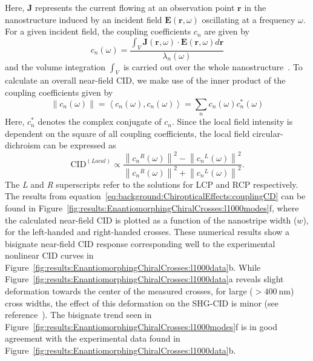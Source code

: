 Here, $\mathbf{J}$ represents the current flowing at an observation point $\mathbf{r}$ in the nanostructure induced by an incident field $\mathbf{E}(\mathbf{r}, \omega)$ oscillating at a frequency $\omega$. For a given incident field, the coupling coefficients $c_n$ are given by
\begin{equation}\label{eq:background:ChiropticalEffects:couplingCoefficients}	
	c_n(\omega) = \frac{\int_{V} \mathbf{J}(\mathbf{r}, \omega) \cdot \mathbf{E}(\mathbf{r}, \omega) d\mathbf{r}}{\lambda_{n}(\omega)}
\end{equation}
and the volume integration $\int_{V}$ is carried out over the whole nanostructure~\cite{Zheng2013}. 
To calculate an overall near-field CID, we make use of the inner product of the coupling coefficients given by
\begin{equation}\label{eq:background:ChiropticalEffects:couplingInnerProduct}	
	\left\| c_{n}(\omega ) \right\| = \left\langle c_{n}(\omega),c_{n}(\omega) \right\rangle = \sum\limits_n c_{n}(\omega) c_{n}^* (\omega)
\end{equation}
Here, $c_{n}^*$ denotes the complex conjugate of $c_{n}$.
Since the local field intensity is dependent on the square of all coupling coefficients, the local field circular-dichroism can be expressed as
\begin{equation}\label{eq:background:ChiropticalEffects:couplingCD}	
	\mathrm{CID}^{(Local)} \propto \frac{{\left\| {{c_n}^R(\omega )} \right\|}^2 - {\left\| {{c_n}^L(\omega )} \right\|}^2}{{\left\| {{c_n}^R(\omega )} \right\|}^2 + {\left\| {{c_n}^L(\omega )} \right\|}^2}.
\end{equation}
The \textit{L} and \textit{R} superscripts refer to the solutions for LCP and RCP respectively. 
The results from equation~\ref{eq:background:ChiropticalEffects:couplingCD} can be found in Figure~\ref{fig:results:EnantiomorphingChiralCrosses:l1000modes}f, where the calculated near-field CID is plotted as a function of the nanostripe width ($w$), for the left-handed and right-handed crosses. These numerical results show a bisignate near-field CID response corresponding well to the experimental nonlinear CID curves in Figure~\ref{fig:results:EnantiomorphingChiralCrosses:l1000data}b. 
While Figure~\ref{fig:results:EnantiomorphingChiralCrosses:l1000data}a reveals slight deformation towards the center of the measured crosses, for large ($>\SI{400}{\nano\m}$) cross widths, the effect of this deformation on the SHG-CID is minor (see reference~\cite{Valev2014}). 
The bisignate trend seen in Figure~\ref{fig:results:EnantiomorphingChiralCrosses:l1000modes}f is in good agreement with the experimental data found in Figure~\ref{fig:results:EnantiomorphingChiralCrosses:l1000data}b.


